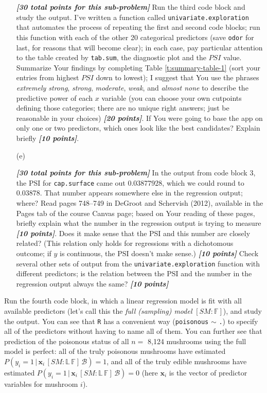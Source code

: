\documentclass[12pt]{article}
\newcommand{\given}{\, | \,}
\newcommand{\bi}[1]{\textbf{\textit{#1}}}
\begin{document}
\begin{itemize}
\bi{[30 total points for this sub-problem]} Run the third code block and study the output. I've written a function called \texttt{univariate.exploration} that automates the process of repeating the first and second code blocks; run this function with each of the other 20 categorical predictors (save \texttt{odor} for last, for reasons that will become clear); in each case, pay particular attention to the table created by \texttt{tab.sum}, the diagnostic plot and the $PSI$ value. Summarize Your findings by completing Table \ref{t:summary-table-1} (sort your entries from highest $PSI$ down to lowest); I suggest that You use the phrases \textit{extremely strong}, \textit{strong}, \textit{moderate}, \textit{weak}, and \textit{almost none} to describe the predictive power of each $x$ variable (you can choose your own cutpoints defining those categories; there are no unique right answers; just be reasonable in your choices) \bi{[20 points]}. If You were going to base the app on only one or two predictors, which ones look like the best candidates? Explain briefly \bi{[10 points]}.

\item[(e)]

\bi{[30 total points for this sub-problem]} In the output from code block 3, the PSI for \texttt{cap.surface} came out 0.03877928, which we could round to 0.03878. That number appears somewhere else in the regression output; where? Read pages 748--749 in DeGroot and Schervish (2012), available in the Pages tab of the course Canvas page; based on Your reading of these pages, briefly explain what the number in the regression output is trying to measure \bi{[10 points]}. Does it make sense that the PSI and this number are closely related? (This relation only holds for regressions with a dichotomous outcome; if $y$ is continuous, the PSI doesn't make sense.) \bi{[10 points]} Check several other sets of output from the \texttt{univariate.exploration} function with different predictors; is the relation between the PSI and the number in the regression output always the same? \bi{[10 points]}

\end{itemize}

Run the fourth code block, in which a linear regression model is fit with all available predictors (let's call this the \textit{full (sampling) model} $[ SM \! \! : \! \mathbb{ F } ]$), and study the output. You can see that \texttt{R} has a convenient way (\texttt{poisonous} $\sim$ \texttt{.}) to specify all of the predictors without having to name all of them. You can further see that prediction of the poisonous status of all $n =$ 8,124 mushrooms using the full model is perfect: all of the truly poisonous mushrooms have estimated $P ( y_i = 1 \given \bm{ x }_i \, [ SM \! \! : \! \mathbb{ L } \, \mathbb{ F } ] \, \mathcal{ B } ) = 1$, and all of the truly edible mushrooms have estimated $P ( y_i = 1 \given \bm{ x }_i \, [ SM \! \! : \! \mathbb{ L } \, \mathbb{ F } ] \, \mathcal{ B } ) = 0$ (here $\bm{ x }_i$ is the vector of predictor variables for mushroom $i$). 
\end{document}
